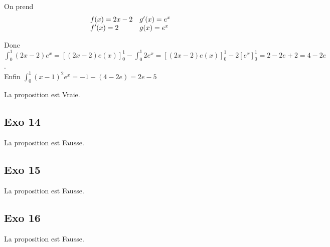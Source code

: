 \documentclass[]{book}
\theoremstyle{definition}
\begin{document}
On prend
$$
\begin{array}{l l}
 f(x) = 2x-2 & g'(x) = e^x\\
 f'(x) = 2   & g(x) = e^x\\
\end{array}
$$

\medskip
Donc $\int_0^1 (2x-2)e^x = [(2x-2)e(x)]_0^1 - \int_0^1 2e^x = [(2x-2)e(x)]_0^1 - 2[e^x]_0^1 = 2 - 2e + 2 = 4 - 2e$.\\

Enfin $\int_0^1(x-1)^2e^x = -1 - (4 - 2e) = 2e - 5$


La proposition est Vraie.

\subsection*{Exo 14}

La proposition est Fausse.

\subsection*{Exo 15}

La proposition est Fausse.

\subsection*{Exo 16}

La proposition est Fausse.
\end{document}
